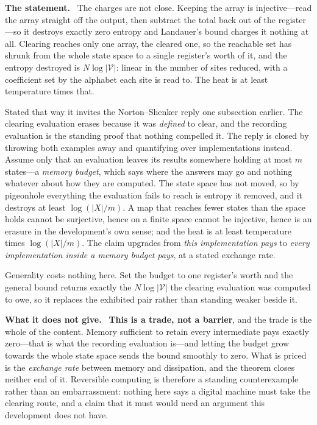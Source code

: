 \documentclass[11pt]{article}
\newcommand{\statement}{\par\smallskip\noindent\textbf{The statement.}\ }
\newcommand{\scope}{\par\smallskip\noindent\textbf{What it does not give.}\ }
\begin{document}
\statement
The charges are not close. Keeping the array is injective---read the array
straight off the output, then subtract the total back out of the register---so
it destroys exactly zero entropy and Landauer's bound charges it nothing at
all. Clearing reaches only one array, the cleared one, so the reachable set has
shrunk from the whole state space to a single register's worth of it, and the
entropy destroyed is $N\log\lvert\mathcal{V}\rvert$: linear in the number of
sites reduced, with a coefficient set by the alphabet each site is read to. The
heat is at least temperature times that.

Stated that way it invites the Norton--Shenker reply one subsection earlier.
The clearing evaluation erases because it was \emph{defined} to clear, and the
recording evaluation is the standing proof that nothing compelled it. The reply
is closed by throwing both examples away and quantifying over implementations
instead. Assume only that an evaluation leaves its results somewhere holding at
most $m$ states---a \emph{memory budget}, which says where the answers may go
and nothing whatever about how they are computed. The state space has not moved,
so by pigeonhole everything the evaluation fails to reach is entropy it removed,
and it destroys at least $\log(\lvert X\rvert/m)$. A map that reaches fewer
states than the space holds cannot be surjective, hence on a finite space cannot
be injective, hence is an erasure in the development's own sense; and the heat
is at least temperature times $\log(\lvert X\rvert/m)$. The claim upgrades from
\emph{this implementation pays} to \emph{every implementation inside a memory
budget pays}, at a stated exchange rate.

Generality costs nothing here. Set the budget to one register's worth and the
general bound returns exactly the $N\log\lvert\mathcal{V}\rvert$ the clearing
evaluation was computed to owe, so it replaces the exhibited pair rather than
standing weaker beside it.

\scope
\textbf{This is a trade, not a barrier}, and the trade is the whole of the
content. Memory sufficient to retain every intermediate pays exactly zero---that
is what the recording evaluation is---and letting the budget grow towards the
whole state space sends the bound smoothly to zero. What is priced is the
\emph{exchange rate} between memory and dissipation, and the theorem closes
neither end of it. Reversible computing is therefore a standing counterexample
rather than an embarrassment: nothing here says a digital machine must take the
clearing route, and a claim that it must would need an argument this development
does not have.
\end{document}
